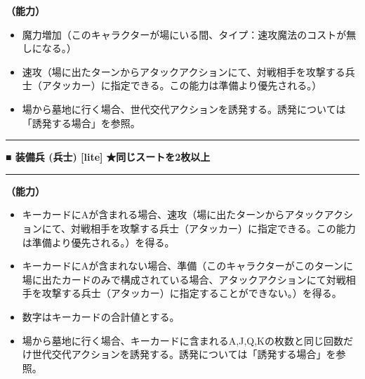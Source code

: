 \documentclass[twocolumn,a5paper,papersize,10pt]{jarticle}
\begin{document}
{\bf（能力）}


\vspace{-1zh}%
\begin{itemize}
\setlength{\leftskip}{-0.3cm}
\setlength{\parskip}{0pt} %

\item 魔力増加（このキャラクターが場にいる間、タイプ：速攻魔法のコストが無しになる。）

\item 速攻（場に出たターンからアタックアクションにて、対戦相手を攻撃する兵士（アタッカー）に指定できる。この能力は準備より優先される。）

\item 場から墓地に行く場合、世代交代アクションを誘発する。誘発については「誘発する場合」を参照。
\vspace{-1zh}%
\end{itemize}
\vspace{2mm} %
\hrule height 0.5mm depth 0mm width 66.5mm %
\vspace{1mm} %
{\small\bf ■ 装備兵 {\scriptsize (兵士) [lite]}} %
\hfill 
{\footnotesize\bf ★同じスートを2枚以上 }

\vspace{1mm}%
\hrule height 0.1mm depth 0mm width 66.5mm %
\vspace{1mm}%

{\bf（能力）}


\vspace{-1zh}%
\begin{itemize}
\setlength{\leftskip}{-0.3cm}
\setlength{\parskip}{0pt} %

\item キーカードにAが含まれる場合、速攻（場に出たターンからアタックアクションにて、対戦相手を攻撃する兵士（アタッカー）に指定できる。この能力は準備より優先される。）を得る。

\item キーカードにAが含まれない場合、準備（このキャラクターがこのターンに場に出たカードのみで構成されている場合、アタックアクションにて対戦相手を攻撃する兵士（アタッカー）に指定することができない。）を得る。

\item 数字はキーカードの合計値とする。

\item 場から墓地に行く場合、キーカードに含まれるA,J,Q,Kの枚数と同じ回数だけ世代交代アクションを誘発する。誘発については「誘発する場合」を参照。
\vspace{-1zh}%
\end{itemize}
\end{document}
